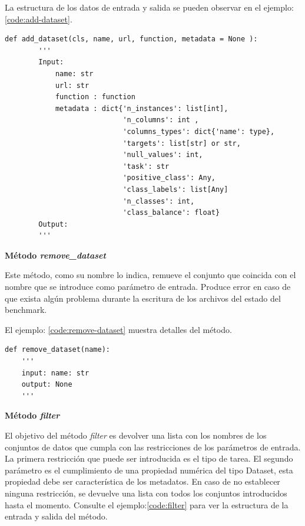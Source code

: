 La estructura de los datos de entrada y salida se pueden observar en el ejemplo:\ref{code:add-dataset}. 

\begin{lstlisting}[caption= Método add\_dataset, label= code:add-dataset]
    def add_dataset(cls, name, url, function, metadata = None ):
        '''
        Input:
            name: str
            url: str
            function : function
            metadata : dict{'n_instances': list[int],
                            'n_columns': int , 
                            'columns_types': dict{'name': type},
                            'targets': list[str] or str,
                            'null_values': int,
                            'task': str 
                            'positive_class': Any,
                            'class_labels': list[Any] 
                            'n_classes': int, 
                            'class_balance': float}
        Output: 
        ''' 
\end{lstlisting}

\begin{flushleft} 
    { \textbf{Método \textit{remove\_dataset} }}\label{method:remove}
\end{flushleft}
Este método, como su nombre lo indica, remueve el conjunto que coincida con el nombre que se introduce como parámetro de entrada. 
Produce error en caso de que exista algún problema durante la escritura de los archivos del estado del benchmark.

El ejemplo: \ref{code:remove-dataset} muestra detalles del método.

\begin{lstlisting}[caption= Método remove\_dataset, label= code:remove-dataset]
def remove_dataset(name):
    '''
    input: name: str
    output: None
    '''
\end{lstlisting}

\begin{flushleft} 
    { \textbf{Método \textit{filter}}}\label{method:filter}
\end{flushleft}
El objetivo del método \textit{filter} es devolver una lista con los nombres de los conjuntos de datos que cumpla con las restricciones de los parámetros de entrada. 
La primera restricción que puede ser introducida es el tipo de tarea. El segundo parámetro es el cumplimiento de una propiedad numérica del tipo Dataset, esta propiedad 
debe ser característica de los metadatos. En caso de no establecer ninguna restricción, se devuelve una lista con todos los conjuntos introducidos hasta el momento.
Consulte el ejemplo:\ref{code:filter} para ver la estructura de la entrada y salida del método.

